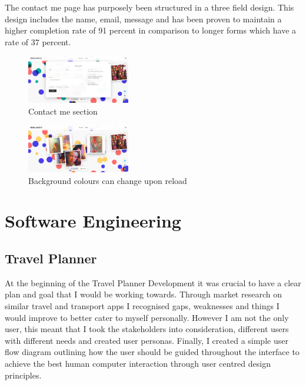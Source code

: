 \documentclass[]{project_final}
\begin{document}
The contact me page has purposely been structured in a three field design. This design includes the name, email, message and has been proven to maintain a higher completion rate of 91 percent in comparison to longer forms which have a rate of 37 percent.

\begin{figure}[ht!]
    \centering
    \includegraphics[width=0.4\textwidth]{AG35.png}
    \vspace*{0.0cm}
    \caption{Contact me section}
    \label{fig:1}
\end{figure}

\begin{figure}[ht!]
    \centering
    \includegraphics[width=0.4\textwidth]{AG36.png}
    \vspace*{0.0cm}
    \caption{Background colours can change upon reload}
    \label{fig:1}
\end{figure}

\chapter{Software Engineering}
\section{Travel Planner}
At the beginning of the Travel Planner Development it was crucial to have a clear plan and goal that I would be working towards. Through market research on similar travel and transport apps I recognised gaps, weaknesses and things I would improve to better cater to myself personally. However I am not the only user, this meant that I took the stakeholders into consideration, different users with different needs and created user personas.
Finally, I created a simple user flow diagram outlining how the user should be guided throughout the interface to achieve the best human computer interaction through user centred design principles.
\end{document}
